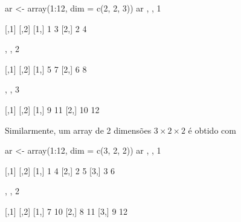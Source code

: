 \documentclass[
  10pt,
  a4paper]{book}
\newenvironment{Shaded}{\begin{snugshade}}{\end{snugshade}}
\newcommand{\AttributeTok}[1]{\textcolor[rgb]{0.77,0.63,0.00}{#1}}
\newcommand{\DecValTok}[1]{\textcolor[rgb]{0.00,0.00,0.81}{#1}}
\newcommand{\FunctionTok}[1]{\textcolor[rgb]{0.00,0.00,0.00}{#1}}
\newcommand{\NormalTok}[1]{#1}
\newcommand{\OtherTok}[1]{\textcolor[rgb]{0.56,0.35,0.01}{#1}}
\newcommand{\SpecialCharTok}[1]{\textcolor[rgb]{0.00,0.00,0.00}{#1}}
\begin{document}
\begin{Shaded}
\begin{Highlighting}[]
\NormalTok{ar }\OtherTok{\textless{}{-}} \FunctionTok{array}\NormalTok{(}\DecValTok{1}\SpecialCharTok{:}\DecValTok{12}\NormalTok{, }\AttributeTok{dim =} \FunctionTok{c}\NormalTok{(}\DecValTok{2}\NormalTok{, }\DecValTok{2}\NormalTok{, }\DecValTok{3}\NormalTok{))}
\NormalTok{ar}
\NormalTok{, , }\DecValTok{1}

\NormalTok{     [,}\DecValTok{1}\NormalTok{] [,}\DecValTok{2}\NormalTok{]}
\NormalTok{[}\DecValTok{1}\NormalTok{,]    }\DecValTok{1}    \DecValTok{3}
\NormalTok{[}\DecValTok{2}\NormalTok{,]    }\DecValTok{2}    \DecValTok{4}

\NormalTok{, , }\DecValTok{2}

\NormalTok{     [,}\DecValTok{1}\NormalTok{] [,}\DecValTok{2}\NormalTok{]}
\NormalTok{[}\DecValTok{1}\NormalTok{,]    }\DecValTok{5}    \DecValTok{7}
\NormalTok{[}\DecValTok{2}\NormalTok{,]    }\DecValTok{6}    \DecValTok{8}

\NormalTok{, , }\DecValTok{3}

\NormalTok{     [,}\DecValTok{1}\NormalTok{] [,}\DecValTok{2}\NormalTok{]}
\NormalTok{[}\DecValTok{1}\NormalTok{,]    }\DecValTok{9}   \DecValTok{11}
\NormalTok{[}\DecValTok{2}\NormalTok{,]   }\DecValTok{10}   \DecValTok{12}
\end{Highlighting}
\end{Shaded}

Similarmente, um array de 2 dimensões \(3 \times 2 \times 2\) é obtido com

\begin{Shaded}
\begin{Highlighting}[]
\NormalTok{ar }\OtherTok{\textless{}{-}} \FunctionTok{array}\NormalTok{(}\DecValTok{1}\SpecialCharTok{:}\DecValTok{12}\NormalTok{, }\AttributeTok{dim =} \FunctionTok{c}\NormalTok{(}\DecValTok{3}\NormalTok{, }\DecValTok{2}\NormalTok{, }\DecValTok{2}\NormalTok{))}
\NormalTok{ar}
\NormalTok{, , }\DecValTok{1}

\NormalTok{     [,}\DecValTok{1}\NormalTok{] [,}\DecValTok{2}\NormalTok{]}
\NormalTok{[}\DecValTok{1}\NormalTok{,]    }\DecValTok{1}    \DecValTok{4}
\NormalTok{[}\DecValTok{2}\NormalTok{,]    }\DecValTok{2}    \DecValTok{5}
\NormalTok{[}\DecValTok{3}\NormalTok{,]    }\DecValTok{3}    \DecValTok{6}

\NormalTok{, , }\DecValTok{2}

\NormalTok{     [,}\DecValTok{1}\NormalTok{] [,}\DecValTok{2}\NormalTok{]}
\NormalTok{[}\DecValTok{1}\NormalTok{,]    }\DecValTok{7}   \DecValTok{10}
\NormalTok{[}\DecValTok{2}\NormalTok{,]    }\DecValTok{8}   \DecValTok{11}
\NormalTok{[}\DecValTok{3}\NormalTok{,]    }\DecValTok{9}   \DecValTok{12}
\end{Highlighting}
\end{Shaded}
\end{document}

